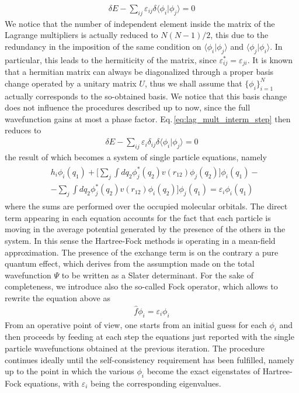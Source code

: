\begin{align}
    \delta E - \sum_{ij} \varepsilon_{ij} \delta \langle \phi_i \vert \phi_j \rangle = 0
    \label{eq:lag_mult_interm_step}
\end{align}
We notice that the number of independent element inside the matrix of the Lagrange multipliers is actually reduced to $N(N-1)/2$, this due to the redundancy in the imposition of the same condition on $\langle \phi_i \vert \phi_j \rangle$ and $\langle \phi_j \vert \phi_i \rangle$. In particular, this leads to the hermiticity of the matrix, since $\varepsilon_{ij}^* = \varepsilon_{ji}$. It is known that a hermitian matrix can always be diagonalized through a proper basis change operated by a unitary matrix $U$, thus we shall assume that $\{\phi_i\}_{i=1}^N$ actually corresponds to the so-obtained basis. We notice that this basis change does not influence the procedures described up to now, since the full wavefunction gains at most a phase factor. Eq.\,\ref{eq:lag_mult_interm_step} then reduces to
\begin{align*}
    \delta E - \sum_{ij} \varepsilon_{i} \delta_{ij} \delta \langle \phi_i \vert \phi_j \rangle = 0
\end{align*}
the result of which becomes a system of single particle equations, namely
\begin{align}
\begin{split}
     &h_i \phi_i(q_1) + \bigg[ \sum_j \int dq_2 \phi_j^*(q_2) v(r_{12}) \phi_j(q_2) \bigg] \phi_i (q_1) - \\
    & - \sum_j \int dq_2 \phi_j^*(q_2) v(r_{12}) \phi_i(q_2) \bigg] \phi_j (q_1) = \varepsilon_i \phi_i (q_1)
\end{split}
\label{eq:fock_matrix_t_ind}
\end{align}
where the sums are performed over the occupied molecular orbitals. The direct term appearing in each equation accounts for the fact that each particle is moving in the average potential generated by the presence of the others in the system. In this sense the Hartree-Fock methods is operating in a mean-field approximation. The presence of the exchange term is on the contrary a pure quantum effect, which derives from the assumption made on the total wavefunction $\Psi$ to be written as a Slater determinant. For the sake of completeness, we introduce also the so-called Fock operator, which allows to rewrite the equation above as
\begin{align*}
    \hat{f} \phi_i = \varepsilon_i \phi_i
\end{align*}
From an operative point of view, one starts from an initial guess for each $\phi_i$ and then proceeds by feeding at each step the equations just reported with the single particle wavefunctions obtained at the previous iteration. The procedure continues ideally until the self-consistency requirement has been fulfilled, namely up to the point in which the various $\phi_i$ become the exact eigenstates of Hartree-Fock equations, with $\varepsilon_i$ being the corresponding eigenvalues. 



